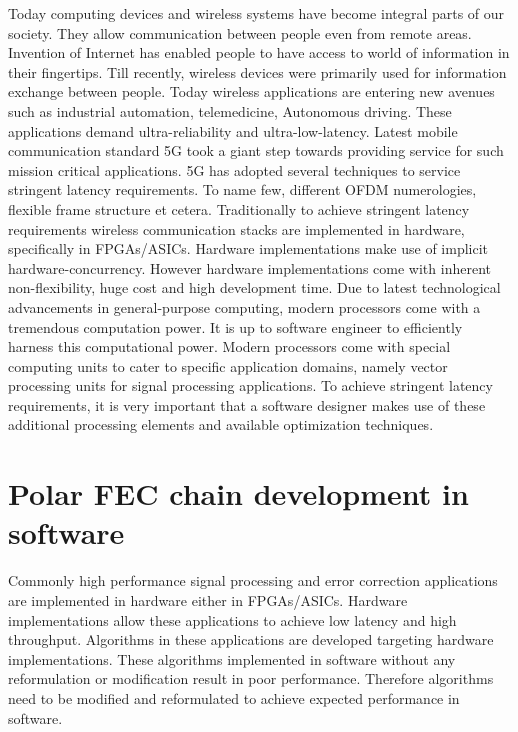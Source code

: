 Today computing devices and wireless systems have become integral parts of our society. They allow communication between people even from remote areas. Invention of Internet has enabled people to have access to world of information in their fingertips. Till recently, wireless devices were primarily used for information exchange between people. Today wireless applications are entering new avenues such as industrial automation, telemedicine, Autonomous driving. These applications demand ultra-reliability and ultra-low-latency. Latest mobile communication standard 5G took a giant step towards providing service for such mission critical applications. 5G has adopted several techniques to service stringent latency requirements. To name few, different OFDM numerologies, flexible frame structure et cetera. Traditionally to achieve stringent latency requirements wireless communication stacks are implemented in hardware, specifically in FPGAs/ASICs. Hardware implementations make use of implicit hardware-concurrency. However hardware implementations come with inherent non-flexibility, huge cost and high development time. Due to latest technological advancements in general-purpose computing, modern processors come with a tremendous computation power. It is up to software engineer to efficiently harness this computational power. Modern processors come with special computing units to cater to specific application domains, namely vector processing units for signal processing applications. To achieve stringent latency requirements, it is very important that a software designer makes use of these additional processing elements and available optimization techniques.

%
%

\section{Polar FEC chain development in software}
Commonly high performance signal processing and error correction applications are implemented in hardware either in FPGAs/ASICs. Hardware implementations allow these applications to achieve low latency and high throughput. Algorithms in these applications are developed targeting hardware implementations. These algorithms implemented in software without any reformulation or modification result in poor performance. Therefore algorithms need to be modified and reformulated to achieve expected performance in software. \newline

